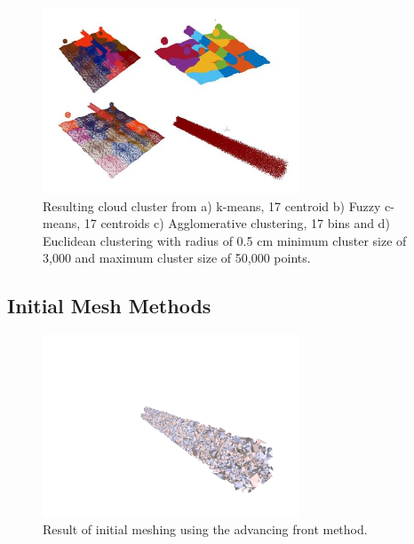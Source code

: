 \documentclass[12pt]{drexelthesis}
\let\Oldsubsection\subsection
\renewcommand{\subsection}{\FloatBarrier\Oldsubsection}
\begin{document}
\begin{figure}[!h]
	\label{2cmnoise:segcompare}
	\centering
		\includegraphics[width=3in]{simulated-lab-scan/2cmnoise/comparison.jpg}
		\caption[Comparison of unsupervised segmentation techniques on simulated dataset with induced noise.]{\centering Resulting cloud cluster from a) k-means, 17 centroid b) Fuzzy c-means, 17 centroids c) Agglomerative clustering, 17 bins and d) Euclidean clustering with radius of 0.5 cm minimum cluster size of 3,000 and maximum cluster size of 50,000 points.}
\end{figure}


\subsection{Initial Mesh Methods}

\begin{figure}[!h]
	\label{2cmnoise:advancingfront}
	\centering
		\includegraphics[trim={4.5in 1in 1in 3in},clip,width=3in]{simulated-lab-scan/2cmnoise/2cmmesh/advancingfront00.png}
		\caption[Initial meshing using a raw advancing front approach]{\centering  Result of initial meshing using the advancing front method.}
\end{figure}
\end{document}
